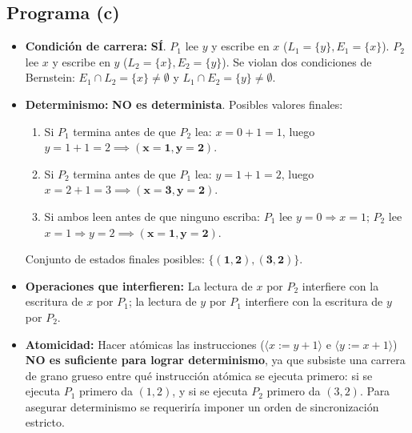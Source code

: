 \begin{solucion}
\subsection*{Programa (c)}
\begin{itemize}[leftmargin=*]
    \item \textbf{Condición de carrera:} \textbf{SÍ}. $P_1$ lee $y$ y escribe en $x$ ($L_1 = \{y\}, E_1 = \{x\}$). $P_2$ lee $x$ y escribe en $y$ ($L_2 = \{x\}, E_2 = \{y\}$). Se violan dos condiciones de Bernstein: $E_1 \cap L_2 = \{x\} \neq \emptyset$ y $L_1 \cap E_2 = \{y\} \neq \emptyset$.
    \item \textbf{Determinismo:} \textbf{NO es determinista}. Posibles valores finales:
    \begin{enumerate}
        \item Si $P_1$ termina antes de que $P_2$ lea: $x = 0 + 1 = 1$, luego $y = 1 + 1 = 2 \implies \mathbf{(x=1, y=2)}$.
        \item Si $P_2$ termina antes de que $P_1$ lea: $y = 1 + 1 = 2$, luego $x = 2 + 1 = 3 \implies \mathbf{(x=3, y=2)}$.
        \item Si ambos leen antes de que ninguno escriba: $P_1$ lee $y=0 \Rightarrow x=1$; $P_2$ lee $x=1 \Rightarrow y=2 \implies \mathbf{(x=1, y=2)}$.
    \end{enumerate}
    Conjunto de estados finales posibles: $\mathbf{\{(1, 2), (3, 2)\}}$.
    \item \textbf{Operaciones que interfieren:} La lectura de $x$ por $P_2$ interfiere con la escritura de $x$ por $P_1$; la lectura de $y$ por $P_1$ interfiere con la escritura de $y$ por $P_2$.
    \item \textbf{Atomicidad:} Hacer atómicas las instrucciones ($\langle x := y + 1 \rangle$ e $\langle y := x + 1 \rangle$) \textbf{NO es suficiente para lograr determinismo}, ya que subsiste una carrera de grano grueso entre qué instrucción atómica se ejecuta primero: si se ejecuta $P_1$ primero da $(1, 2)$, y si se ejecuta $P_2$ primero da $(3, 2)$. Para asegurar determinismo se requeriría imponer un orden de sincronización estricto.
\end{itemize}


\end{solucion}

